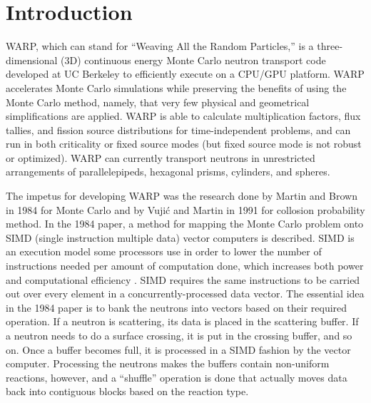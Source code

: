 \documentclass[preprint,12pt]{elsarticle}
\begin{document}
\linenumbers


\section{Introduction}
\label{sec:intro}

WARP, which can stand for ``Weaving All the Random Particles,'' is a three-dimensional (3D) continuous energy Monte Carlo neutron transport code developed at UC Berkeley to efficiently execute on a CPU/GPU platform.  WARP accelerates Monte Carlo simulations while preserving the benefits of using the Monte Carlo method, namely, that very few physical and geometrical simplifications are applied.  WARP is able to calculate multiplication factors, flux tallies, and fission source distributions for time-independent problems, and can run in both criticality or fixed source modes (but fixed source mode is not robust or optimized).  WARP can currently transport neutrons in unrestricted arrangements of parallelepipeds, hexagonal prisms, cylinders, and spheres.

The impetus for developing WARP was the research done by Martin and Brown in 1984 \cite{vector} for Monte Carlo and by Vuji\'{c} and Martin in 1991 \cite{vujic_vector} for collosion probability method.  In the 1984 paper, a method for mapping the Monte Carlo problem onto SIMD (single instruction multiple data) vector computers is described.  SIMD is an execution model some processors use in order to lower the number of instructions needed per amount of computation done, which increases both power and computational efficiency \cite{simd_power}.  SIMD requires the same instructions to be carried out over every element in a concurrently-processed data vector.  The essential idea in the 1984 paper is to bank the neutrons into vectors based on their required operation.  If a neutron is scattering, its data is placed in the scattering buffer.  If a neutron needs to do a surface crossing, it is put in the crossing buffer, and so on.  Once a buffer becomes full, it is processed in a SIMD fashion by the vector computer.  Processing the neutrons makes the buffers contain non-uniform reactions, however, and a ``shuffle'' operation is done that actually moves data back into contiguous blocks based on the reaction type.  
\end{document}
